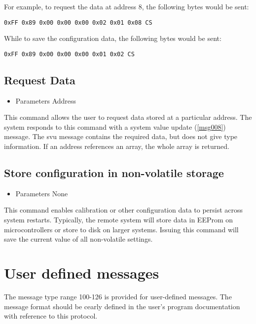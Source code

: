 For example, to request the data at address 8, the following bytes would be sent:
\begin{verbatim}
0xFF 0x89 0x00 0x00 0x00 0x02 0x01 0x08 CS
\end{verbatim}

While to save the configuration data, the following bytes would be sent:
\begin{verbatim}
0xFF 0x89 0x00 0x00 0x00 0x01 0x02 CS
\end{verbatim}

\subsection{Request Data}
\label{scm:rqd}

\begin{itemize}
\item Parameters
\subitem Address
\end{itemize}

This command allows the user to request data stored at a particular address. The system responds to this command with a system value update (\ref{msg008}) message. The svu message contains the required data, but does not give type information. If an address references an array, the whole array is returned.

\subsection{Store configuration in non-volatile storage}
\label{scm:scd}

\begin{itemize}
\item Parameters
\subitem None
\end{itemize}

This command enables calibration or other configuration data to persist across system restarts. Typically, the remote system will store data in EEProm on microcontrollers or store to disk on larger systems. Issuing this command will save the current value of all non-volatile settings.

\section{User defined messages}
\label{msg-user}
The message type range 100-126 is provided for user-defined messages. The message format should be cearly defined in the user's program documentation with reference to this protocol.

